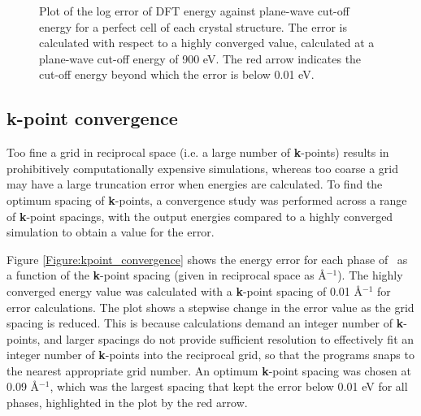 \begin{figure}[ht] %
	\begin{center}
		\caption{Plot of the log error of DFT energy against plane-wave cut-off energy for a perfect cell of each crystal structure. The error is calculated with respect to a highly converged value, calculated at a plane-wave cut-off energy of 900 eV. The red arrow indicates the cut-off energy beyond which the error is below 0.01 eV.}
		\label{Figure:cutoffconvergence}
	\end{center}
\end{figure}

\subsection{\textbf{k}-point convergence}

Too fine a grid in reciprocal space (i.e. a large number of \textbf{k}-points) results in prohibitively computationally expensive simulations, whereas too coarse a grid may have a large truncation error when energies are calculated. To find the optimum spacing of \textbf{k}-points, a convergence study was performed across a range of \textbf{k}-point spacings, with the output energies compared to a highly converged simulation to obtain a value for the error. 

Figure \ref{Figure:kpoint_convergence} shows the energy error for each phase of \zirconia\ as a function of the \textbf{k}-point spacing (given in reciprocal space as \r{A}$^{-1}$). The highly converged energy value was calculated with a \textbf{k}-point spacing of 0.01 \r{A}$^{-1}$ for error calculations. The plot shows a stepwise change in the error value as the grid spacing is reduced. This is because calculations demand an integer number of \textbf{k}-points, and larger spacings do not provide sufficient resolution to effectively fit an integer number of \textbf{k}-points into the reciprocal grid, so that the programs snaps to the nearest appropriate grid number. An optimum \textbf{k}-point spacing was chosen at 0.09 \r{A}$^{-1}$, which was the largest spacing that kept the error below 0.01 eV for all phases, highlighted in the plot by the red arrow.

